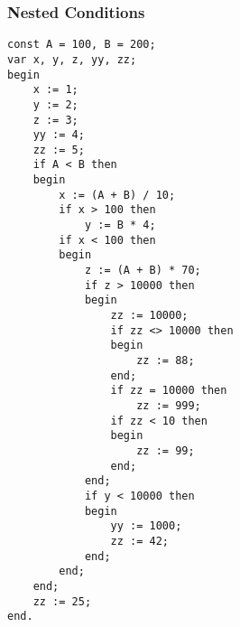 \documentclass[12pt]{memoir}
\begin{document}
\pagebreak

\subsubsection*{Nested Conditions}
\begin{lstlisting}
const A = 100, B = 200;
var x, y, z, yy, zz;
begin
    x := 1;
    y := 2;
    z := 3;
    yy := 4;
    zz := 5;
    if A < B then
    begin
        x := (A + B) / 10;
        if x > 100 then
            y := B * 4;
        if x < 100 then
        begin
            z := (A + B) * 70;
            if z > 10000 then
            begin
                zz := 10000;
                if zz <> 10000 then
                begin
                    zz := 88;
                end;
                if zz = 10000 then
                    zz := 999;
                if zz < 10 then
                begin
                    zz := 99;
                end;
            end;
            if y < 10000 then
            begin
                yy := 1000;
                zz := 42;
            end;
        end;
    end;
    zz := 25;
end.
\end{lstlisting}
\end{document}
